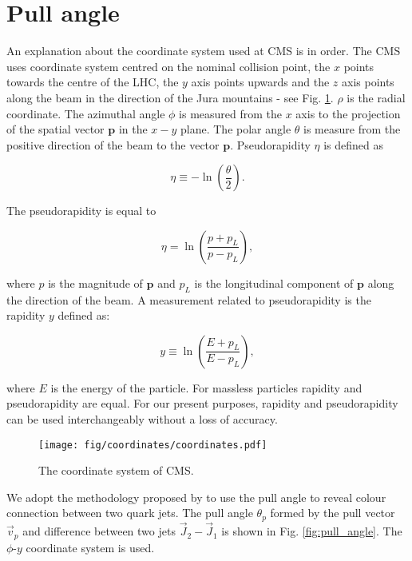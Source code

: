 \section{Pull angle}

An explanation about the coordinate system used at CMS is in order. The CMS uses coordinate system centred on the nominal collision point, the $x$ points towards the centre of the LHC, the $y$ axis points upwards and the $z$ axis points along the beam in the direction of the Jura mountains - see Fig. \ref{fig:CMScoordinates}. $\rho$ is the radial coordinate. The azimuthal angle $\phi$ is measured from the $x$ axis to the projection of the spatial vector $\textbf{p}$ in the $x-y$ plane. The polar angle $\theta$ is measure from the positive direction of the beam to the vector $\textbf{p}$. Pseudorapidity $\eta$ is defined as

\begin{equation}
\eta\equiv-\ln\left(\frac{\theta}{2}\right).
\end{equation}

The pseudorapidity is equal to

\begin{equation}
\eta=\ln\left(\frac{p+p_{L}}{p-p_{L}}\right),
\end{equation}

where $p$ is the magnitude of $\textbf{p}$ and $p_{L}$ is the longitudinal component of $\textbf{p}$ along the direction of the beam.
A measurement related to pseudorapidity is the rapidity $y$ defined as:

\begin{equation}
y\equiv\ln\left(\frac{E+p_{L}}{E-p_{L}}\right),
\end{equation}

where $E$ is the energy of the particle. For massless particles rapidity and pseudorapidity are equal. For our present purposes, rapidity and pseudorapidity can be used interchangeably without a loss of accuracy.

\begin{figure}[hptb]
  \centering
  \texttt{[image: fig/coordinates/coordinates.pdf]}
  \caption{The coordinate system of CMS.}
  \label{fig:CMScoordinates}
\end{figure}

We adopt the methodology proposed by \cite{Gallicchio:2010sw} to use the pull angle to reveal colour connection between two quark jets. The pull angle $\theta_{p}$ formed by the pull vector $\vec{v}_{p}$ and difference between two jets $\vec{J}_{2}-\vec{J}_{1}$ is shown in Fig. \ref{fig:pull_angle}. The $\phi$-$y$ coordinate system is used. 

